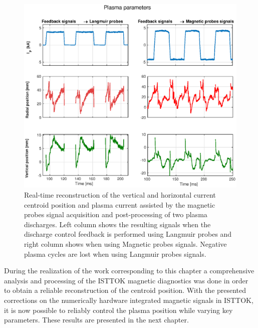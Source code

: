 \begin{figure}[h]
	\centering
	\includegraphics[width=.9\textwidth]{Chp4/Ip_R0_z0.eps}
	\caption{\label{RealTimePos}  Real-time reconstruction of the  vertical and horizontal current centroid position and plasma current  assisted by the magnetic probes signal acquisition and post-processing of two plasma discharges. Left column shows the resulting signals when the discharge control feedback is performed using Langmuir probes and right column shows when using Magnetic probes signals. Negative plasma cycles are lost when using Langmuir probes signals.    }
\end{figure}

During the realization of the work corresponding to this chapter a comprehensive analysis and processing of the ISTTOK magnetic diagnostics was done in order to obtain a reliable reconstruction of the centroid position.  With the presented corrections on the numerically hardware integrated magnetic signals in ISTTOK, it is now possible to reliably control the plasma position while varying key parameters. These results are presented in the next chapter.